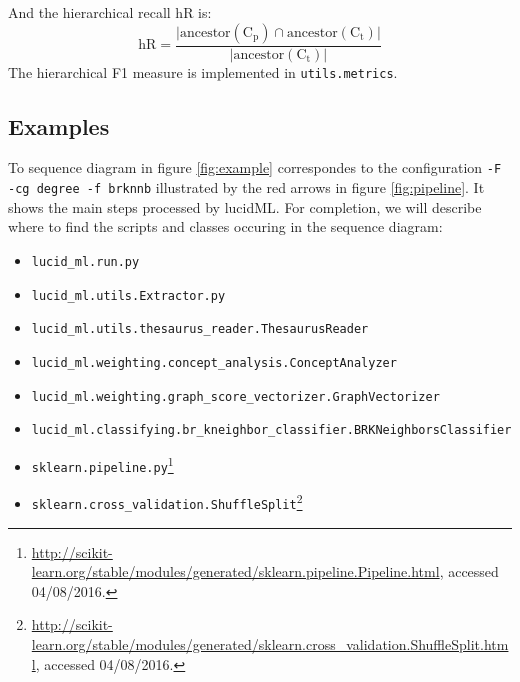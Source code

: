 \documentclass{article}
\begin{document}
And the hierarchical recall $\mathrm{hR}$ is:
\[\mathrm{hR} = \frac{\vert \mathrm{ancestor}(\mathrm{C}_\mathrm{p}) \cap \mathrm{ancestor}(\mathrm{C}_\mathrm{t})\vert}{\vert \mathrm{ancestor}(\mathrm{C}_\mathrm{t})\vert}\]
The hierarchical F1 measure is implemented in \texttt{utils.metrics}.

\subsection{Examples}
To sequence diagram in figure \ref{fig:example} correspondes to the configuration \texttt{-F -cg degree -f brknnb} illustrated
by the red arrows in figure \ref{fig:pipeline}. It shows the main steps processed by lucidML. For completion, we will describe where
to find the scripts and classes occuring in the sequence diagram:
\begin{itemize}
  \item \texttt{lucid\_ml.run.py}
  \item \texttt{lucid\_ml.utils.Extractor.py}
  \item \texttt{lucid\_ml.utils.thesaurus\_reader.ThesaurusReader}
  \item \texttt{lucid\_ml.weighting.concept\_analysis.ConceptAnalyzer}
  \item \texttt{lucid\_ml.weighting.graph\_score\_vectorizer.GraphVectorizer}
  \item \texttt{lucid\_ml.classifying.br\_kneighbor\_classifier.BRKNeighborsClassifier}
  \item \texttt{sklearn.pipeline.py}\footnote{
    \url{http://scikit-learn.org/stable/modules/generated/sklearn.pipeline.Pipeline.html}, accessed 04/08/2016.}
  \item \texttt{sklearn.cross\_validation.ShuffleSplit}\footnote{
    \url{http://scikit-learn.org/stable/modules/generated/sklearn.cross_validation.ShuffleSplit.html}, accessed 04/08/2016.}
 \end{itemize}
\end{document}
